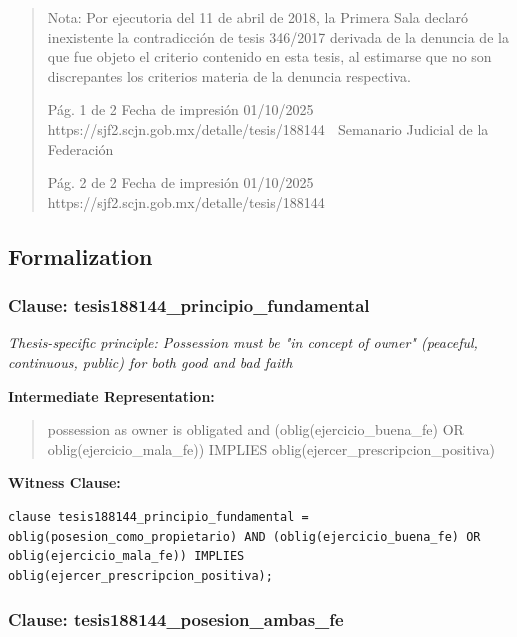 \documentclass[11pt,a4paper]{article}
\begin{document}
\begin{quote}
Nota: Por ejecutoria del 11 de abril de 2018, la Primera Sala declaró inexistente la contradicción de
tesis 346/2017 derivada de la denuncia de la que fue objeto el criterio contenido en esta tesis, al
estimarse que no son discrepantes los criterios materia de la denuncia respectiva.




                                             Pág. 1 de 2             Fecha de impresión 01/10/2025
  https://sjf2.scjn.gob.mx/detalle/tesis/188144
                                                Semanario Judicial de la Federación




                                           Pág. 2 de 2       Fecha de impresión 01/10/2025
https://sjf2.scjn.gob.mx/detalle/tesis/188144

\end{quote}

\subsection{Formalization}

\subsubsection{Clause: tesis188144\_principio\_fundamental}

\textit{Thesis-specific principle: Possession must be "in concept of owner" (peaceful, continuous, public) for both good and bad faith}

\textbf{Intermediate Representation:}

\begin{quote}
possession as owner is obligated and (oblig(ejercicio\_buena\_fe) OR oblig(ejercicio\_mala\_fe)) IMPLIES oblig(ejercer\_prescripcion\_positiva)
\end{quote}

\textbf{Witness Clause:}

\begin{lstlisting}[style=witnessstyle, language=Witness]
clause tesis188144_principio_fundamental = oblig(posesion_como_propietario) AND (oblig(ejercicio_buena_fe) OR oblig(ejercicio_mala_fe)) IMPLIES oblig(ejercer_prescripcion_positiva);
\end{lstlisting}

\subsubsection{Clause: tesis188144\_posesion\_ambas\_fe}
\end{document}
